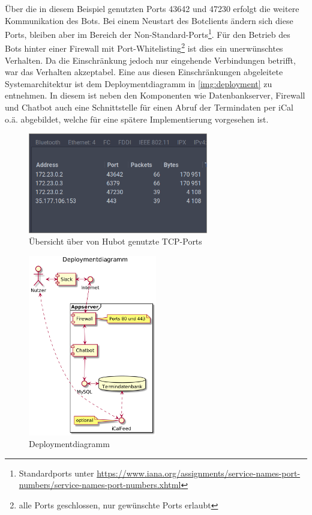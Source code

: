 Über die in diesem Beispiel genutzten Ports 43642 und 47230 erfolgt die weitere Kommunikation des Bots. Bei einem Neustart des Botclients ändern sich diese Ports, bleiben aber im Bereich der Non-Standard-Ports\footnote{Standardports unter \url{https://www.iana.org/assignments/service-names-port-numbers/service-names-port-numbers.xhtml}}. Für den Betrieb des Bots hinter einer Firewall mit Port-Whitelisting\footnote{alle Ports geschlossen, nur gewünschte Ports erlaubt} ist dies ein unerwünschtes Verhalten. Da die Einschränkung jedoch nur eingehende Verbindungen betrifft, war das Verhalten akzeptabel. Eine aus diesen Einschränkungen abgeleitete Systemarchitektur ist dem Deploymentdiagramm in \autoref{img:deployment} zu entnehmen.
In diesem ist neben den Komponenten wie Datenbankserver, Firewall und Chatbot auch eine Schnittstelle für einen Abruf der Termindaten per iCal o.ä. abgebildet, welche für eine spätere Implementierung vorgesehen ist.

\begin{figure}[H]
    \centering
    \includegraphics[width=0.7\textwidth]{img/packetports.png}
    \caption{Übersicht über von Hubot genutzte TCP-Ports}
    \label{img:packetports}
\end{figure}



\begin{figure}[H]
    \centering
    \includegraphics[width=0.5\textwidth]{../docs/uml/architecture.png}
    \caption{Deploymentdiagramm}
    \label{img:deployment}
\end{figure}



